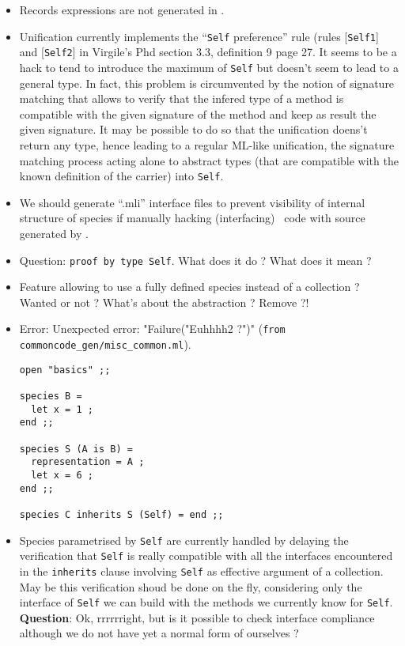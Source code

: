 \begin{itemize}
\item Records expressions are not generated in \coq.

\item Unification currently implements the ``{\tt Self} preference''
  rule (rules [{\tt Self1}] and [{\tt Self2}] in Virgile's Phd section
  3.3, definition 9 page 27. It seems to be a hack to tend to
  introduce the maximum of {\tt Self} but doesn't seem to lead to a
  general type. In fact, this problem is circumvented by the notion of
  signature matching that allows to verify that the infered type of a
  method is compatible with the given signature of the method and keep
  as result the given signature. It may be possible to do so that the
  unification doens't return any type, hence leading to a regular
  ML-like unification, the signature matching process acting alone to
  abstract types (that are compatible with the known definition of the
  carrier) into {\tt Self}.

\item We should generate ``.mli'' interface files to prevent
  visibility of internal structure of species if manually hacking
  (interfacing) \ocaml\ code with source generated by \focalizec.

\item Question: {\tt proof by type Self}. What does it do ? What does
  it mean ?

\item Feature allowing to use a fully defined species instead of a
collection ? Wanted or not ? What's about the abstraction ? Remove ?!

\item Error: Unexpected error: "Failure("Euhhhh2 ?")"
  ({\tt from commoncode\_gen/misc\_common.ml}).
\noindent
{\footnotesize
\begin{lstlisting}
open "basics" ;;

species B =
  let x = 1 ;
end ;;

species S (A is B) =
  representation = A ;
  let x = 6 ;
end ;;

species C inherits S (Self) = end ;;
\end{lstlisting}
}
\item Species parametrised by {\tt Self} are currently handled by
  delaying the verification that {\tt Self} is really compatible with
  all the interfaces encountered in the {\tt inherits} clause
  involving {\tt Self} as effective argument of a collection. May be
  this verification shoud be done on the fly, considering only the
  interface of {\tt Self} we can build with the methods we currently
  know for {\tt Self}. {\bf Question}: Ok, rrrrrright, but is it
  possible to check interface compliance although we do not have yet a
  normal form of ourselves ?

\end{itemize}
